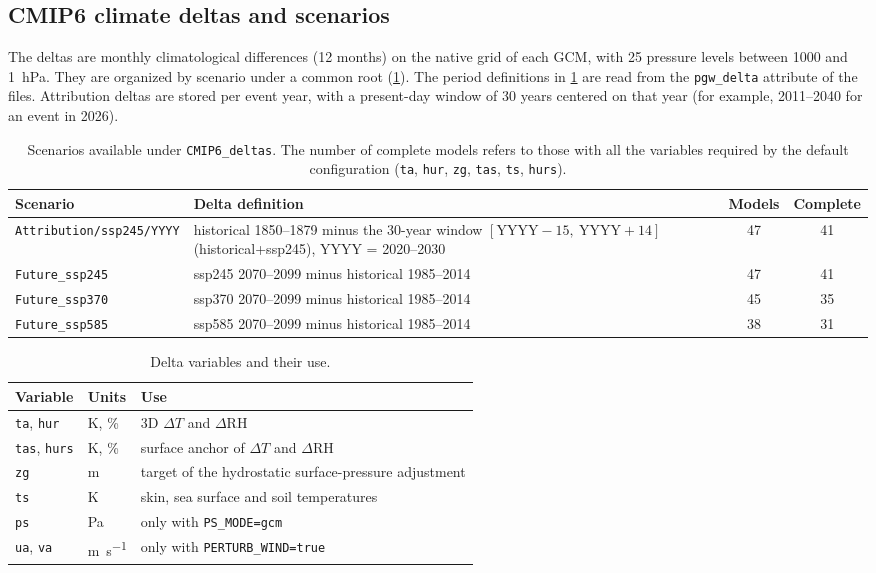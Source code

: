 \documentclass[11pt,a4paper]{article}
\newcommand{\code}[1]{\texttt{#1}}
\newcommand{\dT}{\Delta T}
\newcommand{\dRH}{\Delta \mathrm{RH}}
\begin{document}
\subsection{CMIP6 climate deltas and scenarios}

The deltas are monthly climatological differences (12 months) on the native
grid of each GCM, with 25 pressure levels between 1000 and \SI{1}{hPa}. They
are organized by scenario under a common root (\cref{tab:scen}). The
period definitions in \cref{tab:scen} are read from the \code{pgw\_delta}
attribute of the files. Attribution deltas are stored per event year, with a
present-day window of 30 years centered on that year (for example, 2011--2040
for an event in 2026).

\begin{table}[htbp]
\centering
\caption{Scenarios available under \code{CMIP6\_deltas}. The number of
complete models refers to those with all the variables required by the
default configuration (\code{ta}, \code{hur}, \code{zg}, \code{tas},
\code{ts}, \code{hurs}).}
\label{tab:scen}
\small
\begin{tabularx}{\linewidth}{lXcc}
\toprule
Scenario & Delta definition & Models & Complete \\
\midrule
\code{Attribution/ssp245/YYYY} & historical 1850--1879 minus the 30-year window
  $[\mathrm{YYYY}-15,\ \mathrm{YYYY}+14]$ (historical+ssp245), YYYY = 2020--2030 & 47 & 41 \\
\code{Future\_ssp245} & ssp245 2070--2099 minus historical 1985--2014 & 47 & 41 \\
\code{Future\_ssp370} & ssp370 2070--2099 minus historical 1985--2014 & 45 & 35 \\
\code{Future\_ssp585} & ssp585 2070--2099 minus historical 1985--2014 & 38 & 31 \\
\bottomrule
\end{tabularx}
\end{table}

\begin{table}[htbp]
\centering
\caption{Delta variables and their use.}
\label{tab:vars}
\small
\begin{tabular}{lll}
\toprule
Variable & Units & Use \\
\midrule
\code{ta}, \code{hur} & K, \% & 3D $\dT$ and $\dRH$ \\
\code{tas}, \code{hurs} & K, \% & surface anchor of $\dT$ and $\dRH$ \\
\code{zg} & m & target of the hydrostatic surface-pressure adjustment \\
\code{ts} & K & skin, sea surface and soil temperatures \\
\code{ps} & Pa & only with \code{PS\_MODE=gcm} \\
\code{ua}, \code{va} & \si{m.s^{-1}} & only with \code{PERTURB\_WIND=true} \\
\bottomrule
\end{tabular}
\end{table}
\end{document}
